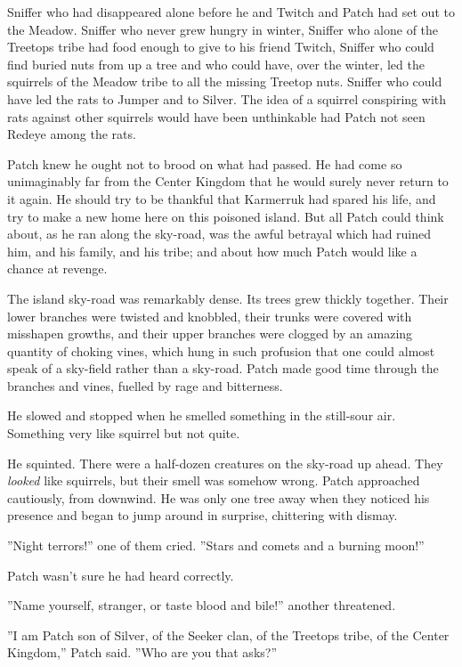 \documentclass[12pt]{book}
\begin{document}
Sniffer who had disappeared alone before he and Twitch and Patch had set out to the Meadow. Sniffer who never grew hungry in winter, Sniffer who alone of the Treetops tribe had food enough to give to his friend Twitch, Sniffer who could find buried nuts from up a tree %
and who could have, over the winter, led the squirrels of the Meadow tribe to all the missing Treetop nuts. Sniffer who could have led the rats to Jumper %
and to Silver. The idea of a squirrel conspiring with rats against other squirrels would have been unthinkable %
had Patch not seen Redeye among the rats.

Patch knew he ought not to brood on what had passed. He had come so unimaginably far from the Center Kingdom that he would surely never return to it again. He should try to be thankful that Karmerruk had spared his life, and try to make a new home here on this poisoned island. But all Patch could think about, as he ran along the sky-road, was the awful betrayal which had ruined him, and his family, and his tribe; and about how much Patch would like a chance at revenge.

The island sky-road was remarkably dense. Its trees grew thickly together. Their lower branches were twisted and knobbled, their trunks were covered with misshapen growths, and their upper branches were clogged by an amazing quantity of choking vines, which hung in such profusion that one could almost speak of a sky-field rather than a sky-road. Patch made good time through the branches and vines, fuelled by rage and bitterness.

He slowed and stopped when he smelled something in the still-sour air. Something very like squirrel%
but not quite.

He squinted. There were a half-dozen creatures on the sky-road up ahead. They {\it looked} like squirrels, but their smell was somehow wrong. Patch approached cautiously, from downwind. He was only one tree away when they noticed his presence and began to jump around in surprise, chittering with dismay.

''Night terrors!'' one of them cried. ''Stars and comets and a burning moon!''

Patch wasn't sure he had heard correctly.

''Name yourself, stranger, or taste blood and bile!'' another threatened.

''I am Patch son of Silver, of the Seeker clan, of the Treetops tribe, of the Center Kingdom,'' Patch said. ''Who are you that asks?''
\end{document}
